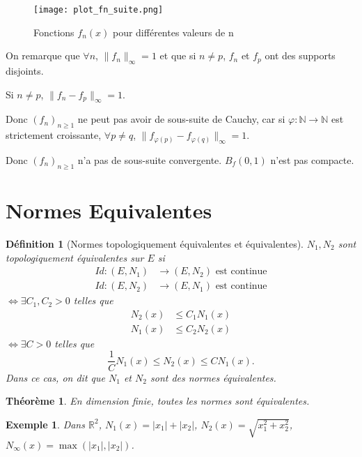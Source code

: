 \documentclass{article}
\newtheorem{theorem}{Théorème}
\newtheorem{definition}{Définition}
\newtheorem{example}{Exemple}
\begin{document}
\begin{figure}[h]
    \centering
    \texttt{[image: plot\_fn\_suite.png]}
    \caption{Fonctions $f_n(x)$ pour différentes valeurs de n}
    \label{fig:plot_fn_suite}
\end{figure}
On remarque que $\forall n$, $\|f_n\|_\infty = 1$ et que si $n \neq p$, $f_n$ et $f_p$ ont des supports disjoints.

Si $n \neq p$, $\|f_n - f_p\|_\infty = 1$.

Donc $(f_n)_{n \geq 1}$ ne peut pas avoir de sous-suite de Cauchy, car si $\varphi : \mathbb{N} \rightarrow \mathbb{N}$ est strictement croissante, $\forall p \neq q$, $\|f_{\varphi(p)} - f_{\varphi(q)}\|_\infty = 1$.

Donc $(f_n)_{n \geq 1}$ n'a pas de sous-suite convergente. $B_f(0, 1)$ n'est pas compacte.

\section{Normes Equivalentes}

\begin{definition}[Normes topologiquement équivalentes et équivalentes]
$N_1, N_2$ sont topologiquement équivalentes sur $E$ si
\begin{align*}
    Id : (E, N_1) &\rightarrow (E, N_2) \text{ est continue} \\
    Id : (E, N_2) &\rightarrow (E, N_1) \text{ est continue}
\end{align*}
$\iff \exists C_1, C_2 > 0$ telles que
\begin{align*}
    N_2(x) &\leq C_1 N_1(x) \\
    N_1(x) &\leq C_2 N_2(x)
\end{align*}
$\iff \exists C > 0$ telles que
\begin{equation}
    \frac{1}{C} N_1(x) \leq N_2(x) \leq C N_1(x).
\end{equation}
Dans ce cas, on dit que $N_1$ et $N_2$ sont des normes équivalentes.
\end{definition}

\begin{theorem}
\label{thm:norm_equiv_finite_dim_again}
En dimension finie, toutes les normes sont équivalentes.
\end{theorem}

\begin{example}
Dans $\mathbb{R}^2$, $N_1(x) = |x_1| + |x_2|$, $N_2(x) = \sqrt{x_1^2 + x_2^2}$, $N_\infty(x) = \max(|x_1|, |x_2|)$.
\end{example}
\end{document}
